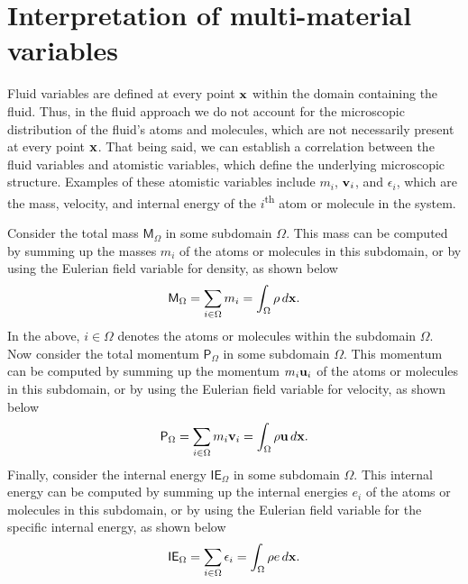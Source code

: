\documentclass[a4paper,11pt]{report}
\begin{document}
\section{Interpretation of multi-material variables}
Fluid variables are defined at every point $\mathbf{x}$ within the domain containing the fluid. Thus, in the fluid approach we do not account for the microscopic distribution of the fluid's atoms and molecules, which are not necessarily present at every point $\mathbf{x}$. That being said, we can establish a correlation between the fluid variables and atomistic variables, which define the underlying microscopic structure. Examples of these atomistic variables include $m_i$, $\mathbf{v}_i$, and $\epsilon_i$, which are the mass, velocity, and internal energy of the $i$\textsuperscript{th} atom or molecule in the system.

Consider the total mass $\mathsf{M}_\Omega$ in some subdomain $\Omega$. This mass can be computed by summing up the masses $m_i$ of the atoms or molecules in this subdomain, or by using the Eulerian field variable for density, as shown below
\begin{equation}
   \mathsf{M}_\Omega = \sum_{i \in \Omega} m_i = \int_{\Omega} \rho \, d\mathbf{x}.
\end{equation} 
In the above, $i \in \Omega$ denotes the atoms or molecules within the subdomain $\Omega$. Now consider the total momentum $\mathsf{P}_\Omega$ in some subdomain $\Omega$. This momentum can be computed by summing up the momentum $m_i \mathbf{u}_i$ of the atoms or molecules in this subdomain, or by using the Eulerian field variable for velocity, as shown below
\begin{equation}
    \mathsf{P}_\Omega = \sum_{i \in \Omega} m_i \mathbf{v}_i = \int_\Omega \rho \mathbf{u} \, d\mathbf{x}.
\end{equation}
Finally, consider the internal energy $\mathsf{IE}_\Omega$ in some subdomain $\Omega$. This internal energy can be computed by summing up the internal energies $e_i$ of the atoms or molecules in this subdomain, or by using the Eulerian field variable for the specific internal energy, as shown below
\begin{equation}
    \mathsf{IE}_\Omega = \sum_{i \in \Omega} \epsilon_i = \int_\Omega \rho e \, d\mathbf{x}.
\end{equation}
\end{document}
